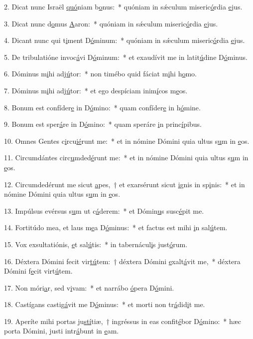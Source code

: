 2. Dicat nunc Israël \uline{quó}niam b\uline{o}nus:~* quóniam in sǽculum miseric\uline{ó}rdia \uline{e}jus.\par 
3. Dicat nunc d\uline{o}mus \uline{A}aron:~* quóniam in sǽculum miseric\uline{ó}rdia \uline{e}jus.\par 
4. Dicant nunc qui t\uline{i}ment D\uline{ó}minum:~* quóniam in sǽculum miseric\uline{ó}rdia \uline{e}jus.\par 
5. De tribulatióne invoc\uline{á}vi D\uline{ó}minum:~* et exaudívit me in latit\uline{ú}dine D\uline{ó}minus.\par 
6. Dóminus m\uline{i}hi adj\uline{ú}tor:~* non timébo quid fáciat m\uline{i}hi h\uline{o}mo.\par 
7. Dóminus m\uline{i}hi adj\uline{ú}tor:~* et ego despíciam inim\uline{í}cos m\uline{e}os.\par 
8. Bonum est confíder\uline{e} in D\uline{ó}mino:~* quam confíder\uline{e} in h\uline{ó}mine.\par 
9. Bonum est sper\uline{á}re in D\uline{ó}mino:~* quam speráre \uline{i}n princ\uline{í}pibus.\par 
10. Omnes Gentes c\uline{i}rcu\uline{ié}runt me:~* et in nómine Dómini quia ultus s\uline{u}m in \uline{e}os.\par 
11. Circumdántes circ\uline{u}mded\uline{é}runt me:~* et in nómine Dómini quia ultus s\uline{u}m in \uline{e}os.\par 
12. Circumdedérunt me sicut \uline{a}pes,~† et exarsérunt sicut \uline{i}gnis in sp\uline{i}nis:~* et in nómine Dómini quia ultus s\uline{u}m in \uline{e}os.\par 
13. Impúlsus evérsus s\uline{u}m ut c\uline{á}derem:~* et Dómin\uline{u}s susc\uline{é}pit me.\par 
14. Fortitúdo mea, et laus m\uline{e}a D\uline{ó}minus:~* et factus est mihi \uline{i}n sal\uline{ú}tem.\par 
15. Vox exsultatiónis, \uline{e}t sal\uline{ú}tis:~* in tabernácul\uline{i}s just\uline{ó}rum.\par 
16. Déxtera Dómini fecit vir\uline{tú}tem:~† déxtera Dómini \uline{e}xalt\uline{á}vit me,~* déxtera Dómini f\uline{e}cit virt\uline{ú}tem.\par 
17. Non móri\uline{a}r, sed v\uline{i}vam:~* et narrábo \uline{ó}pera D\uline{ó}mini.\par 
18. Castígans castig\uline{á}vit me D\uline{ó}minus:~* et morti non tr\uline{á}did\uline{i}t me.\par 
19. Aperíte mihi portas ju\uline{stí}tiæ,~† ingréssus in eas confit\uline{é}bor D\uline{ó}mino:~* hæc porta Dómini, justi intr\uline{á}bunt in \uline{e}am.\par 
